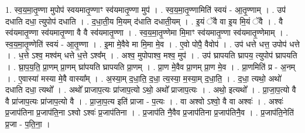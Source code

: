 \documentclass[17pt]{extarticle}
\begin{document}
1. स्व॒य॒मा॒तृ॒ण्णा मुपोप॑ स्वयमातृ॒ण्णाꣳ स्व॑यमातृ॒ण्णा मुप॑ । . स्व॒य॒मा॒तृ॒ण्णामिति॑ स्वयं - आ॒तृ॒ण्णाम् । . उप॑ दधाति दधा॒ त्युपोप॑ दधाति । . द॒धा॒ती॒य मि॒यम् द॑धाति दधाती॒यम् । . इ॒यं ॅवै वा इ॒य मि॒यं ॅवै । . वै स्व॑यमातृ॒ण्णा स्व॑यमातृ॒ण्णा वै वै स्व॑यमातृ॒ण्णा । . स्व॒य॒मा॒तृ॒ण्णेमा मि॒माꣳ स्व॑यमातृ॒ण्णा स्व॑यमातृ॒ण्णेमाम् । . स्व॒य॒मा॒तृ॒ण्णेति॑ स्वयं - आ॒तृ॒ण्णा । . इ॒मा मे॒वैवे मा मि॒मा मे॒व । . ए॒वो पोपै॒ वैवोप॑ । . उप॑ धत्ते धत्त॒ उपोप॑ धत्ते । . ध॒त्ते ऽश्व॒ मश्व॑म् धत्ते ध॒त्ते ऽश्व᳚म् । . अश्व॒ मुपोपाश्व॒ मश्व॒ मुप॑ । . उप॑ घ्रापयति घ्रापय॒ त्युपोप॑ घ्रापयति । . घ्रा॒प॒य॒ति॒ प्रा॒णम् प्रा॒णम् घ्रा॑पयति घ्रापयति प्रा॒णम् । . प्रा॒ण मे॒वैव प्रा॒णम् प्रा॒ण मे॒व । . प्रा॒णमिति॑ प्र - अ॒नम् । . ए॒वास्या॑ मस्या मे॒वै वास्या᳚म् । . अ॒स्या॒म् द॒धा॒ति॒ द॒धा॒ त्य॒स्या॒ म॒स्या॒म् द॒धा॒ति॒ । . द॒धा॒ त्यथो॒ अथो॑ दधाति दधा॒ त्यथो᳚ । . अथो᳚ प्राजाप॒त्यः प्रा॑जाप॒त्यो ऽथो॒ अथो᳚ प्राजाप॒त्यः । . अथो॒ इत्यथो᳚ । . प्रा॒जा॒प॒त्यो वै वै प्रा॑जाप॒त्यः प्रा॑जाप॒त्यो वै । . प्रा॒जा॒प॒त्य इति॑ प्राजा - प॒त्यः । . वा अश्वो ऽश्वो॒ वै वा अश्वः॑ । . अश्वः॑ प्र॒जाप॑तिना प्र॒जाप॑ति॒ना ऽश्वो ऽश्वः॑ प्र॒जाप॑तिना । . प्र॒जाप॑ति नै॒वैव प्र॒जाप॑तिना प्र॒जाप॑तिनै॒व । . प्र॒जाप॑ति॒नेति॑ प्र॒जा - प॒ति॒ना॒ । \newline
\end{document}
